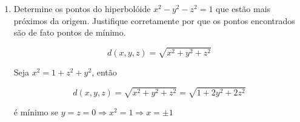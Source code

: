 \documentclass{book}
\begin{document}
\begin{enumerate}
\begin{sol}
\[
\begin{gathered}
  \gamma \left( t \right) = \left( {x_1 \left( t \right),...,x_{n + 1} \left( t \right)} \right) \hfill \\
  p \in {\text{graf}}f \Rightarrow \left( {x_1 ,...,x_n ,f\left( {x_1 ,...,x_n } \right)} \right) \hfill \\
   \Rightarrow \gamma \left( t \right) = \left( {x_1 \left( t \right),...,x_n \left( t \right),f\left( {x_1 \left( t \right),...,x_n \left( t \right)} \right)} \right) \hfill \\
  \overrightarrow n  = \left( {\nabla f, - 1} \right){\text{ normal ao espa\c{c}o tangente}} \hfill \\
  \gamma '\left( t \right) = \left( {x_1 '\left( t \right),...,x_n '\left( t \right),\left\langle {\nabla f,\left( {x_1 '\left( t \right),...,x_n '\left( t \right)} \right)} \right\rangle } \right) \hfill \\
  \left\langle {\overrightarrow n ,\gamma '} \right\rangle  = \left\langle {\left( {\frac{{\partial f}}
{{\partial x_1 }},...,\frac{{\partial f}}
{{\partial x_n }}, - 1} \right),\left( {x_1 ',...,x_n ',\frac{{\partial f}}
{{\partial x_1 }}x_1 ' + ... + \frac{{\partial f}}
{{\partial x_n }}x_n '} \right)} \right\rangle  = 0 \hfill \\
   \Rightarrow \overrightarrow n  \bot \gamma ' \hfill \\
   \Rightarrow \gamma ' \in T_{\gamma \left( {t_0 } \right)} {\text{graf}}f \hfill \\
\end{gathered}
\]

\end{sol}

\textbf{Grupo 2: M\'aximos e m\'inimos.}

  \item Determine os pontos do hiperbol\'oide $x^2-y^2-z^2=1$ que est\~ao mais pr\'oximos da origem. Justifique corretamente por que os pontos encontrados s\~ao de fato pontos de m\'inimo.

\begin{sol}
\[
d\left( {x,y,z} \right) = \sqrt {x^2  + y^2  + z^2 }
\]

Seja $x^2 = 1+z^2+y^2$, ent\~ao

\[
d\left( {x,y,z} \right) = \sqrt {x^2  + y^2  + z^2 }  = \sqrt {1 + 2y^2  + 2z^2 }
\]

\'e m\'inimo se $y=z=0 \Rightarrow x^2=1 \Rightarrow x=\pm 1$


\end{sol}
\end{enumerate}
\end{document}

